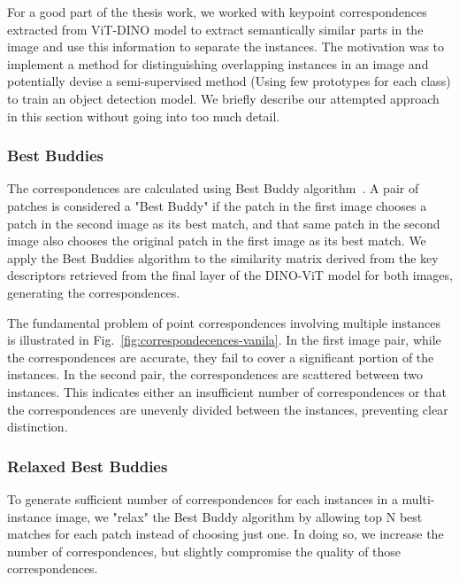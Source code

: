 For a good part of the thesis work, we worked with keypoint correspondences extracted from ViT-DINO model to extract semantically similar parts in the image and use this information to separate the instances. The motivation was to implement a method for distinguishing overlapping instances in an image and potentially devise a semi-supervised method (Using few prototypes for each class) to train an object detection model. We briefly describe our attempted approach in this section without going into too much detail.

\subsubsection{Best Buddies}
The correspondences are calculated using Best Buddy algorithm~\cite{Aberman_2018}. A pair of patches is considered a "Best Buddy" if the patch in the first image chooses a patch in the second image as its best match, and that same patch in the second image also chooses the original patch in the first image as its best match. We apply the Best Buddies algorithm to the similarity matrix derived from the key descriptors retrieved from the final layer of the DINO-ViT model for both images, generating the correspondences.

The fundamental problem of point correspondences involving multiple instances is illustrated in Fig.~\ref{fig:correspondecences-vanila}. 
In the first image pair, while the correspondences are accurate, they fail to cover a significant portion of the instances. In the second pair, the correspondences are scattered between two instances. This indicates either an insufficient number of correspondences or that the correspondences are unevenly divided between the instances, preventing clear distinction.

\subsubsection{Relaxed Best Buddies}
To generate sufficient number of correspondences for each instances in a multi-instance image, we "relax" the Best Buddy algorithm by allowing top N best matches for each patch instead of choosing just one. In doing so, we increase the number of correspondences, but slightly compromise the quality of those correspondences.

